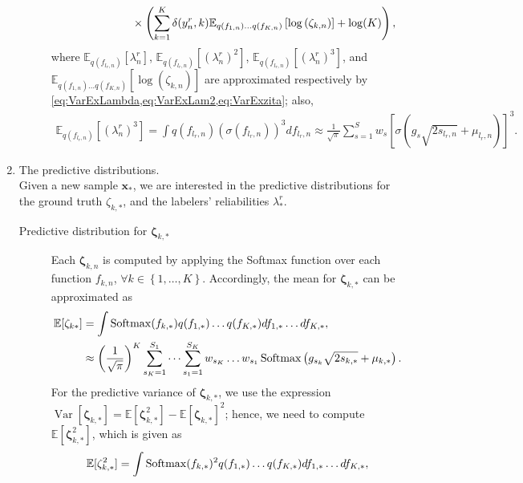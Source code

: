 \documentclass[9pt]{article}
\providecommand{\ve}[1]{{\bm{#1}}}%
\providecommand{\ve}[1]{{\mathbf{#1}}}
\begin{document}
\begin{enumerate}
\begin{description}
\begin{align}
		&\hspace{2.5cm}\times \left(\sum_{k=1}^{K}\delta(y_n^r,k)\mathbb{E}_{q(f_{1,n})\dots q(f_{K,n})}\left[\log\left(\zeta_{k,n}\right)\right] + \log(K)\right),
		\end{align}
		where $\mathbb{E}_{q(f_{l_r,n})}\left[{\lambda}_n^r\right]$, $\mathbb{E}_{q(f_{l_r,n})}\left[\left({\lambda}_n^r\right)^2\right]$, $\mathbb{E}_{q(f_{l_r,n})}\left[\left({\lambda}_n^r\right)^3\right]$, and $\mathbb{E}_{q(f_{1,n})\dots q(f_{K,n})}[\log(\zeta_{k,n})]$ are approximated respectively by \cref{eq:VarExLambda,eq:VarExLam2,eq:VarExzita}; also,
		\begin{align}
		    \mathbb{E}_{q(f_{l_r,n})}[({\lambda}_n^r)^3] = \int q(f_{l_r,n})\left(\sigma(f_{l_r,n})\right)^3df_{l_r,n} \approx \frac{1}{\sqrt{\pi}}\sum_{s=1}^{S}w_s \left[\sigma\left(g_s\sqrt{2s_{l_r,n}} + \mu_{l_r,n}\right)\right]^3.
		\label{eq:VarExLam3}
		\end{align}
	\end{description}
	\item The predictive distributions.\\
Given a new sample $\ve{x}_{*}$, we are interested in the predictive distributions for the ground truth $\zeta_{k,*}$, and the labelers' reliabilities $\lambda_{*}^r$.
\begin{description}
    \item[Predictive distribution for $\mathbf{\zeta}_{k,*}$] Each $\mathbf{\zeta}_{k,n}$ is computed by applying the Softmax function over each function $f_{k,n}$, $\forall k \in\left\{1,\dots , K\right\}$. Accordingly, the mean for $\mathbf{\zeta}_{k,*}$ can be approximated as
    \begin{align}
        \notag\mathbb{E}[\zeta_{k*}] &= \int \operatorname{Softmax}(f_{k,*}) q(f_{1,*})\dots q(f_{K,*}) df_{1,*}\dots df_{K,*},\\
        &\approx \left(\frac{1}{\sqrt{\pi}}\right)^{K}\sum_{s_K=1}^{S_1}\cdots \sum_{s_1=1}^{S_K} w_{s_K}\dots w_{s_1} \operatorname{Softmax}\left(g_{s_k}\sqrt{2s_{k,*}} + \mu_{k,*}\right).
    \end{align}
    For the predictive variance of $\mathbf{\zeta}_{k,*}$, we use the expression $\operatorname{Var}[\mathbf{\zeta}_{k,*}] = \mathbb{E}[\mathbf{\zeta}_{k,*}^2] - \mathbb{E}[\mathbf{\zeta}_{k,*}]^2$; hence, we need to compute $\mathbb{E}[\mathbf{\zeta}_{k,*}^2]$, which is given as
    \begin{align}
        \notag\mathbb{E}[\mathbf{\zeta}_{k,*}^2] &= \int \operatorname{Softmax}(f_{k,*})^2 q(f_{1,*})\dots q(f_{K,*}) df_{1,*}\dots df_{K,*},\\

\end{align}
\end{description}
\end{enumerate}
\end{document}
